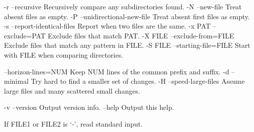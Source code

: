 \begin{textcode}
  -r  --recursive  Recursively compare any subdirectories found.
  -N  --new-file  Treat absent files as empty.
  -P  --unidirectional-new-file  Treat absent first files as empty.
  -s  --report-identical-files  Report when two files are the same.
  -x PAT  --exclude=PAT  Exclude files that match PAT.
  -X FILE  --exclude-from=FILE  Exclude files that match any pattern in FILE.
  -S FILE  --starting-file=FILE  Start with FILE when comparing directories.

  --horizon-lines=NUM  Keep NUM lines of the common prefix and suffix.
  -d  --minimal  Try hard to find a smaller set of changes.
  -H  --speed-large-files  Assume large files and many scattered small changes.

  -v  --version  Output version info.
  --help  Output this help.

If FILE1 or FILE2 is `-', read standard input.
\end{textcode}

